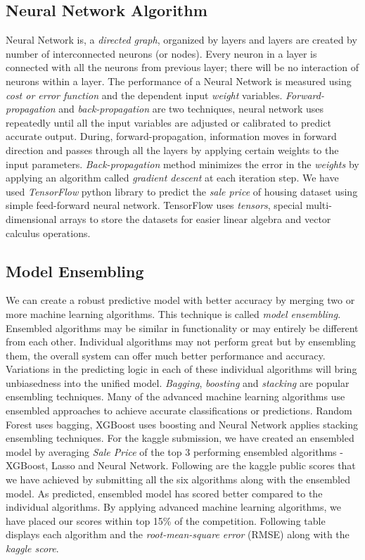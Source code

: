 \documentclass[sigconf]{acmart}
\begin{document}
	\subsection{Neural Network Algorithm}
	Neural Network is, a {\em directed graph}, organized by layers and layers are created by number of interconnected neurons (or nodes). Every neuron in a layer is connected with all the neurons from previous layer; there will be no interaction of neurons within a layer. The performance of a Neural Network is measured using {\em cost or error function} and the dependent input {\em weight} variables. {\em Forward-propagation} and {\em back-propagation} are two techniques, neural network uses repeatedly until all the input variables are adjusted or calibrated to predict accurate output. During, forward-propagation, information moves in forward direction and passes through all the layers by applying certain weights to the input parameters. {\em Back-propagation} method minimizes the error in the {\em weights} by applying an algorithm called {\em gradient descent} at each iteration step. We have used {\em TensorFlow} python library to predict the {\em sale price} of housing dataset using simple feed-forward neural network. TensorFlow uses {\em tensors}, special multi-dimensional arrays to store the datasets for easier linear algebra and vector calculus operations.
		
	\subsection{Model Ensembling}
	We can create a robust predictive model with better accuracy by merging two or more machine learning algorithms. This technique is called {\em model ensembling}. Ensembled algorithms may be similar in functionality or may entirely be different from each other. Individual algorithms may not perform great but by ensembling them, the overall system can offer much better performance and accuracy. Variations in the predicting logic in each of these individual algorithms will bring unbiasedness into the unified model. {\em Bagging}, {\em boosting} and {\em stacking} are popular ensembling techniques. Many of the advanced machine learning algorithms use ensembled approaches to achieve accurate classifications or predictions. Random Forest uses bagging, XGBoost uses boosting and Neural Network applies stacking ensembling techniques. For the kaggle submission, we have created an ensembled model by averaging {\em Sale Price} of the top 3 performing ensembled algorithms - XGBoost, Lasso and Neural Network.  Following are the kaggle public scores that we have achieved by submitting all the six algorithms along with the ensembled model. As predicted, ensembled model has scored better compared to the individual algorithms. By applying advanced machine learning algorithms, we have placed our scores within top 15\% of the competition. Following table displays each algorithm and the {\em root-mean-square error} (RMSE) along with the {\em kaggle score}.
	
\end{document}
